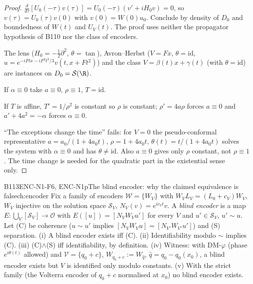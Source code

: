 \begin{proof}
$\frac d{d\tau}[U_0(-\tau)v(\tau)]=U_0(-\tau)(v'+iH_0v)=0$, so $v(\tau)=U_0(\tau)v(0)$ with $v(0)=W(0)u_0$. Conclude by density of $D_0$ and boundedness of $W(t)$ and $U_V(t)$. The proof uses neither the propagator hypothesis of B110 nor the class of encoders.

The lens ($H_0=-\frac12\partial^2$, $\theta=\tan$), Avron--Herbst ($V=Fx$, $\theta=\mathrm{id}$, $u=e^{-iFtx-iF^2t^3/3}v(t,x+Ft^2)$) and the class $V=\beta(t)x+\gamma(t)$ (with $\theta=\mathrm{id}$) are instances on $D_0=\mathcal S(\R)$.

If $\alpha\equiv0$ take $a\equiv0$, $\rho\equiv1$, $T=\mathrm{id}$.

If $T$ is affine, $T'=1/\rho^2$ is constant so $\rho$ is constant; $\rho'=4a\rho$ forces $a\equiv0$ and $a'+4a^2=-\alpha$ forces $\alpha\equiv0$.

``The exceptions change the time'' fails: for $V=0$ the pseudo-conformal representative $a=a_0/(1+4a_0t)$, $\rho=1+4a_0t$, $\theta(t)=t/(1+4a_0t)$ solves the system with $\alpha\equiv0$ and has $\theta\ne\mathrm{id}$. Also $a\equiv0$ gives only $\rho$ constant, not $\rho\equiv1$. The time change is needed for the quadratic part in the existential sense only.

\end{proof}

\begin{dimcard}{B113}{ENC-N1-F6, ENC-N1p}{The blind encoder: why the claimed equivalence is false}{\pw}{ch:encoder}
Fix a family of encoders $\mathcal W=\{W_V\}$ with $W_VL_V=(L_0+c_V)W_V$, $W_V$ injective on the solution space $\mathcal S_V$, $N_V(v)=e^{ic_Vt}v$. A \emph{blind encoder} is a map $E:\bigcup_V[\mathcal S_V]\to\mathcal O$ with $E([u])=[N_VW_Vu']$ for every $V$ and $u'\in\mathcal S_V$, $u'\sim u$. Let (C) be coherence ($u\sim u'$ implies $[N_VW_Vu]=[N_{V'}W_{V'}u']$) and (S) separation.
(i) A blind encoder exists iff (C). (ii) Identifiability modulo $\sim$ implies (C). (iii) (C)$\wedge$(S) iff identifiability, by definition. (iv) Witness: with DM-$\varphi$ (phase $e^{i\theta(t)}$ allowed) and $\mathcal V=\{q_0+c\}$, $W_{q_0+c}:=W_{\hat q}$, $\hat q=q_0-q_0(x_0)$, a blind encoder exists but $V$ is identified only modulo constants. (v) With the strict family (the Volterra encoder of $q_0+c$ normalised at $x_0$) no blind encoder exists.
\end{dimcard}

